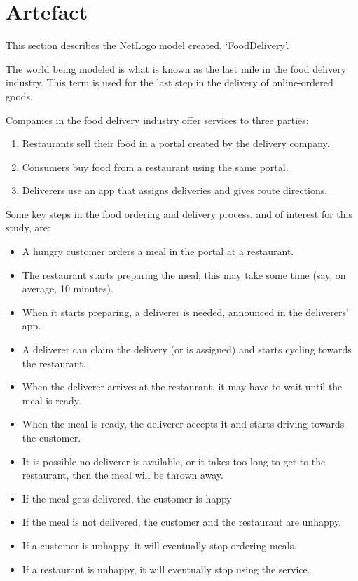 \section{Artefact}\label{sec:artefact}
This section describes the NetLogo model created, `FoodDelivery'.

The world being modeled is what is known as the last mile in the food delivery industry.
This term is used for the last step in the delivery of online-ordered goods.

Companies in the food delivery industry offer services to three parties:
\begin{enumerate}
    \item Restaurants sell their food in a portal created by the delivery company.
    \item Consumers buy food from a restaurant using the same portal.
    \item Deliverers use an app that assigns deliveries and gives route directions.
\end{enumerate}

Some key steps in the food ordering and delivery process, and of interest for this study, are:
\begin{itemize}
    \item A hungry customer orders a meal in the portal at a restaurant.
    \item The restaurant starts preparing the meal; this may take some time (say, on average, 10 minutes).
    \item When it starts preparing, a deliverer is needed, announced in the deliverers' app.
    \item A deliverer can claim the delivery (or is assigned) and starts cycling towards the restaurant.
    \item When the deliverer arrives at the restaurant, it may have to wait until the meal is ready.
    \item When the meal is ready, the deliverer accepts it and starts driving towards the customer.
    \item It is possible no deliverer is available, or it takes too long to get to the restaurant,
then the meal will be thrown away.
    \item If the meal gets delivered, the customer is happy
    \item If the meal is not delivered, the customer and the restaurant are unhappy.
    \item If a customer is unhappy, it will eventually stop ordering meals.
    \item If a restaurant is unhappy, it will eventually stop using the service.
\end{itemize}

